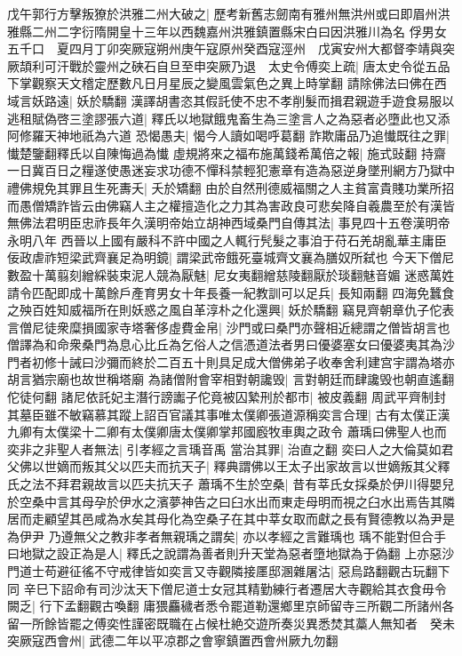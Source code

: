 戊午郭行方擊叛獠於洪雅二州大破之|{
	歷考新舊志劒南有雅州無洪州或曰即眉州洪雅縣二州二字衍隋開皇十三年以西魏嘉州洪雅鎮置縣宋白曰因洪雅川為名}
俘男女五千口　夏四月丁卯突厥寇朔州庚午寇原州癸酉寇涇州　戊寅安州大都督李靖與突厥頡利可汗戰於靈州之硤石自旦至申突厥乃退　太史令傅奕上疏|{
	唐太史令從五品下掌觀察天文稽定歷數凡日月星辰之變風雲氣色之異上時掌翻}
請除佛法曰佛在西域言妖路遠|{
	妖於驕翻}
漢譯胡書恣其假託使不忠不孝削髮而揖君親遊手遊食易服以逃租賦偽啓三塗謬張六道|{
	釋氏以地獄餓鬼畜生為三塗言人之為惡者必墮此也又添阿修羅天神地祇為六道}
恐愒愚夫|{
	愒今人讀如喝呼葛翻}
詐欺庸品乃追懴既往之罪|{
	懴楚鑒翻釋氏以自陳悔過為懴}
虛規將來之福布施萬錢希萬倍之報|{
	施式䜴翻}
持齋一日冀百日之糧遂使愚迷妄求功德不憚科禁輕犯憲章有造為惡逆身墜刑網方乃獄中禮佛規免其罪且生死夀夭|{
	夭於矯翻}
由於自然刑德威福關之人主貧富貴賤功業所招而愚僧矯詐皆云由佛竊人主之權擅造化之力其為害政良可悲矣降自羲農至於有漢皆無佛法君明臣忠祚長年久漢明帝始立胡神西域桑門自傳其法|{
	事見四十五卷漢明帝永明八年}
西晉以上國有嚴科不許中國之人輒行髠髮之事洎于苻石羌胡亂華主庸臣佞政虐祚短梁武齊襄足為明鏡|{
	謂梁武帝餓死臺城齊文襄為膳奴所弑也}
今天下僧尼數盈十萬翦刻繒綵裝束泥人競為厭魅|{
	尼女夷翻繒慈陵翻厭於琰翻魅音媚}
迷惑萬姓請令匹配即成十萬餘戶產育男女十年長養一紀教訓可以足兵|{
	長知兩翻}
四海免蠶食之殃百姓知威福所在則妖惑之風自革淳朴之化還興|{
	妖於驕翻}
竊見齊朝章仇子佗表言僧尼徒衆糜損國家寺塔奢侈虛費金帛|{
	沙門或曰桑門亦聲相近總謂之僧皆胡言也僧譯為和命衆桑門為息心比丘為乞俗人之信憑道法者男曰優婆塞女曰優婆夷其為沙門者初修十誡曰沙彌而終於二百五十則具足成大僧佛弟子收奉舍利建宫宇謂為塔亦胡言猶宗廟也故世稱塔廟}
為諸僧附會宰相對朝讒毁|{
	言對朝廷而肆讒毁也朝直遙翻佗徒何翻}
諸尼依託妃主潛行謗讟子佗竟被囚縶刑於都市|{
	被皮義翻}
周武平齊制封其墓臣雖不敏竊慕其蹤上詔百官議其事唯太僕卿張道源稱奕言合理|{
	古有太僕正漢九卿有太僕梁十二卿有太僕卿唐太僕卿掌邦國廏牧車輿之政令}
蕭瑀曰佛聖人也而奕非之非聖人者無法|{
	引孝經之言瑀音禹}
當治其罪|{
	治直之翻}
奕曰人之大倫莫如君父佛以世嫡而叛其父以匹夫而抗天子|{
	釋典謂佛以王太子出家故言以世嫡叛其父釋氏之法不拜君親故言以匹夫抗天子}
蕭瑀不生於空桑|{
	昔有莘氏女採桑於伊川得嬰兒於空桑中言其母孕於伊水之濱夢神告之曰臼水出而東走母明而視之臼水出焉告其隣居而走顧望其邑咸為水矣其母化為空桑子在其中莘女取而獻之長有賢德教以為尹是為伊尹}
乃遵無父之教非孝者無親瑀之謂矣|{
	亦以孝經之言難瑀也}
瑀不能對但合手曰地獄之設正為是人|{
	釋氏之說謂為善者則升天堂為惡者墮地獄為于偽翻}
上亦惡沙門道士苟避征徭不守戒律皆如奕言又寺觀隣接㕓邸溷雜屠沽|{
	惡烏路翻觀古玩翻下同}
辛巳下詔命有司沙汰天下僧尼道士女冠其精勤練行者遷居大寺觀給其衣食毋令闕乏|{
	行下孟翻觀古喚翻}
庸猥麤穢者悉令罷道勒還鄉里京師留寺三所觀二所諸州各留一所餘皆罷之傅奕性謹密既職在占候杜絶交遊所奏災異悉焚其藁人無知者　癸未突厥寇西會州|{
	武德二年以平凉郡之會寧鎮置西會州厥九勿翻}

